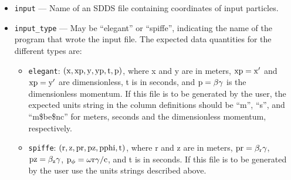 \documentclass[11pt]{article}
\begin{document}
\begin{itemize}
\item \verb|input| --- Name of an  SDDS file containing coordinates of input particles.
\item \verb|input_type| --- May be ``elegant'' or ``spiffe'', indicating the name of the
program that wrote the input file.  The expected data quantities for the different types are:
\begin{itemize}
\item {\tt elegant}: ${\rm (x, xp, y, yp, t, p)}$, where x and y are
in meters, ${\rm xp=x^\prime}$ and ${\rm xp=y^\prime}$ are
dimensionless, t is in seconds, and ${\rm p=\beta\gamma}$ is the
dimensionless momentum. If this file is to be generated by the user,
the expected units string in the column definitions should be ``m'',
``s'', and ``m\$be\$nc'' for meters, seconds and the dimensionless
momentum, respectively.

\item {\tt spiffe}: ${\rm (r, z, pr, pz, pphi, t)}$, where r and z are
in meters, ${\rm pr=\beta_r \gamma}$, ${\rm pz = \beta_z \gamma}$,
${\rm p_\phi = \omega r \gamma/c}$, and t is in seconds. If this file
is to be generated by the user use the units strings described above.
\end{itemize}


\end{itemize}
\end{document}
